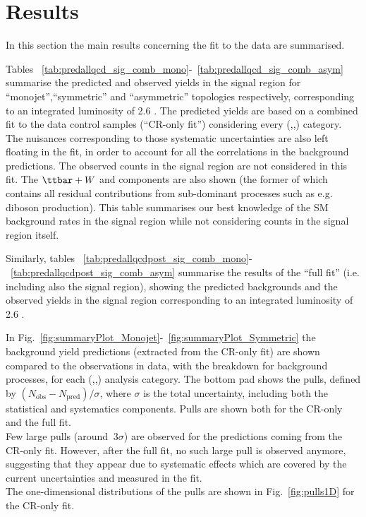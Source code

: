\section{Results}
\label{sec:results}

In this section the main results concerning the fit to the data are summarised. 

Tables ~\ref{tab:predallqcd_sig_comb_mono}-~\ref{tab:predallqcd_sig_comb_asym} summarise 
the predicted and observed yields in the signal region 
for ``monojet'',``symmetric'' and ``asymmetric'' topologies respectively, 
corresponding to an integrated luminosity of 2.6 \ifb.
The predicted yields are based on a combined fit to the data control samples (``CR-only fit'') considering every (\nj,\nb,\scalht) category. 
The nuisances corresponding to those systematic uncertainties are also left floating in the fit, 
in order to account for all the correlations in the background predictions. 
The observed counts in the signal region are not considered in this fit. 
The $\ttbar+W$ and \znunu components are also shown (the former of which contains all residual contributions from sub-dominant processes such as e.g. diboson production). 
This table summarises our best knowledge of the SM background rates in the signal region while not considering counts in the signal region itself. 

Similarly, tables ~\ref{tab:predallqcdpost_sig_comb_mono}-~\ref{tab:predallqcdpost_sig_comb_asym} summarise the results of the ``full fit'' (i.e. including also the signal region), showing the predicted backgrounds and the observed yields in the signal region corresponding to an integrated luminosity of 2.6 \ifb. 

In Fig.~\ref{fig:summaryPlot_Monojet}-~\ref{fig:summaryPlot_Symmetric} the background yield predictions (extracted from the CR-only fit) 
are shown compared to the observations in data, with the breakdown for background processes, for each (\njet,\nb,\scalht) analysis category. 
The bottom pad shows the pulls, defined by $(N_{\mathrm{obs}}-N_{\mathrm{pred}})/\sigma$, where $\sigma$ is the total uncertainty, 
including both the statistical and systematics components. Pulls are shown both for the CR-only and the full fit. \\
Few large pulls (around $~3\sigma$) are observed for the predictions coming from the CR-only fit. 
However, after the full fit, no such large pull is observed anymore, suggesting that 
they appear due to systematic effects which are covered by the current uncertainties and measured in the fit. \\
The one-dimensional distributions of the pulls are shown in Fig.~\ref{fig:pulls1D} for the CR-only fit. 

